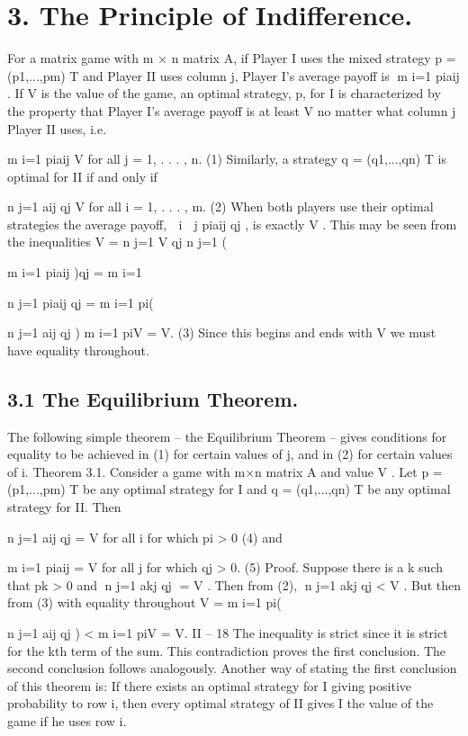 \documentclass[]{report}
\begin{document}

\section{3. The Principle of Indifference.}
For a matrix game with m × n matrix A, if Player I uses the mixed strategy p =
(p1,...,pm)
T and Player II uses column j, Player I’s average payoff is m
i=1 piaij . If V is
the value of the game, an optimal strategy, p, for I is characterized by the property that
Player I’s average payoff is at least V no matter what column j Player II uses, i.e.

m
i=1
piaij \geq V for all j = 1, . . . , n. (1)
Similarly, a strategy q = (q1,...,qn)
T is optimal for II if and only if

n
j=1
aij qj \leq V for all i = 1, . . . , m. (2)
When both players use their optimal strategies the average payoff, 
i

j piaij qj , is exactly
V . This may be seen from the inequalities
V = 
n
j=1
V qj \leq 
n
j=1
(

m
i=1
piaij )qj = 
m
i=1

n
j=1
piaij qj
= 
m
i=1
pi(

n
j=1
aij qj ) \leq 
m
i=1
piV = V.
(3)
Since this begins and ends with V we must have equality throughout.

\subsection{3.1 The Equilibrium Theorem.} The following simple theorem – the Equilibrium
Theorem – gives conditions for equality to be achieved in (1) for certain values of j, and
in (2) for certain values of i.
Theorem 3.1. Consider a game with m×n matrix A and value V . Let p = (p1,...,pm)
T
be any optimal strategy for I and q = (q1,...,qn)
T be any optimal strategy for II. Then

n
j=1
aij qj = V for all i for which pi > 0 (4)
and

m
i=1
piaij = V for all j for which qj > 0. (5)
Proof. Suppose there is a k such that pk > 0 and n
j=1 akj qj = V . Then from (2),
n
j=1 akj qj < V . But then from (3) with equality throughout
V = 
m
i=1
pi(

n
j=1
aij qj ) < 
m
i=1
piV = V.
II – 18
The inequality is strict since it is strict for the kth term of the sum. This contradiction
proves the first conclusion. The second conclusion follows analogously.
Another way of stating the first conclusion of this theorem is: If there exists an optimal
strategy for I giving positive probability to row i, then every optimal strategy of II gives
I the value of the game if he uses row i.
\end{document}
